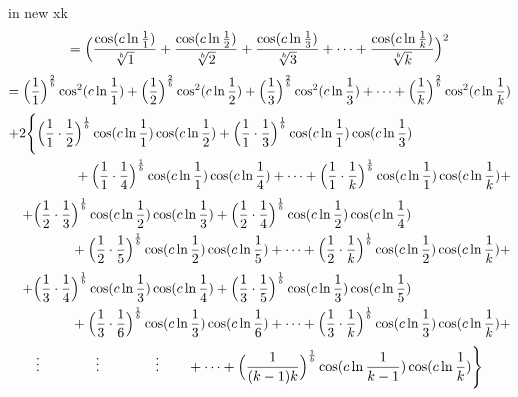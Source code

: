 \documentclass{amsart}
\begin{document}
	in new xk
	\[ = \Bigl( \frac{\cos({c\ln \frac{1}{1}})}{\sqrt[b]{1}} + \frac{\cos({c\ln \frac{1}{2}})}{\sqrt[b]{2}} + \frac{\cos({c\ln \frac{1}{3}})}{\sqrt[b]{3}} + \dots + \frac{\cos({c\ln \frac{1}{k}})}{\sqrt[b]{k}} \Bigr)^2 \]
	\[ = \Bigl( \frac{1}{1} \Bigr)^{\frac2b}\cos^2({c \ln \frac{1}{1}}) + \Bigl( \frac{1}{2} \Bigr)^{\frac2b}\cos^2({c \ln \frac{1}{2}}) + \Bigl( \frac{1}{3} \Bigr)^{\frac2b}\cos^2({c \ln \frac{1}{3}}) + \dots + \Bigl( \frac{1}{k} \Bigr)^{\frac2b}\cos^2({c \ln \frac{1}{k}}) \]
	\[
	\begin{aligned}
		+2\Biggl\{ \Bigl( \frac{1}{1} \cdot \frac{1}{2}& \Bigr)^\frac1b \cos(c \ln \frac{1}{1}) \cos(c \ln \frac{1}{2}) + \Bigl( \frac{1}{1} \cdot \frac{1}{3} \Bigr)^\frac1b \cos(c \ln \frac{1}{1}) \cos(c \ln \frac{1}{3}) \\ 
		& + \Bigl( \frac{1}{1} \cdot \frac{1}{4} \Bigr)^\frac1b \cos(c \ln \frac{1}{1}) \cos(c \ln \frac{1}{4}) + \dots + \Bigl( \frac{1}{1} \cdot \frac{1}{k} \Bigr)^\frac1b \cos(c \ln \frac{1}{1}) \cos(c \ln \frac{1}{k}) + \\ 		
	\end{aligned}
	\]
	\[
	\begin{aligned}
		\quad + \Bigl( \frac{1}{2} \cdot \frac{1}{3}& \Bigr)^\frac1b \cos(c \ln \frac{1}{2}) \cos(c \ln \frac{1}{3}) + \Bigl( \frac{1}{2} \cdot \frac{1}{4} \Bigr)^\frac1b \cos(c \ln \frac{1}{2}) \cos(c \ln \frac{1}{4}) \\ 
		& + \Bigl( \frac{1}{2} \cdot \frac{1}{5} \Bigr)^\frac1b \cos(c \ln \frac{1}{2}) \cos(c \ln \frac{1}{5}) + \dots + \Bigl( \frac{1}{2} \cdot \frac{1}{k} \Bigr)^\frac1b \cos(c \ln \frac{1}{2}) \cos(c \ln \frac{1}{k}) + \\ 		
	\end{aligned}
	\]
	\[
	\begin{aligned}
		\quad + \Bigl( \frac{1}{3} \cdot \frac{1}{4}& \Bigr)^\frac1b \cos(c \ln \frac{1}{3}) \cos(c \ln \frac{1}{4}) + \Bigl( \frac{1}{3} \cdot \frac{1}{5} \Bigr)^\frac1b \cos(c \ln \frac{1}{3}) \cos(c \ln \frac{1}{5}) \\ 
		& + \Bigl( \frac{1}{3} \cdot \frac{1}{6} \Bigr)^\frac1b \cos(c \ln \frac{1}{3}) \cos(c \ln \frac{1}{6}) + \dots + \Bigl( \frac{1}{3} \cdot \frac{1}{k} \Bigr)^\frac1b \cos(c \ln \frac{1}{3}) \cos(c \ln \frac{1}{k}) + \\ 		
	\end{aligned}
	\]
	\[
	\begin{aligned}
		\vdots \qquad\qquad \vdots \qquad\qquad \vdots \qquad + \dots + \Bigl( \frac{1}{(k-1)k} \Bigr)^\frac1b \cos(c \ln \frac{1}{k-1}) \cos(c \ln \frac{1}{k}) \Biggr\}
	\end{aligned}
	\]
	
\end{document}
